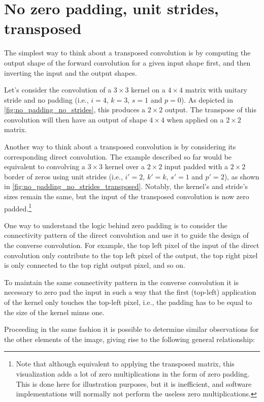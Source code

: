 \documentclass[notitlepage]{report}
\begin{document}
\section{No zero padding, unit strides, transposed}

The simplest way to think about a transposed convolution is by computing the
output shape of the forward convolution for a given input shape first, and then
inverting the input and the output shapes.

Let's consider the convolution of a $3 \times 3$ kernel on a $4 \times 4$
matrix with unitary stride and no padding (i.e., $i = 4$, $k = 3$, $s = 1$ and
$p = 0$). As depicted in \autoref{fig:no_padding_no_strides}, this produces a
$2 \times 2$ output. The transpose of this convolution will then have an output
of shape $4 \times 4$ when applied on a $2 \times 2$ matrix.

Another way to think about a transposed convolution is by considering its
corresponding direct convolution. The example described so far would be
equivalent to convolving a $3 \times 3$ kernel over a $2 \times 2$ input padded
with a $2 \times 2$ border of zeros using unit strides (i.e., $i' = 2$, $k' =
k$, $s' = 1$ and $p' = 2$), as shown in
\autoref{fig:no_padding_no_strides_transposed}. Notably, the kernel's and
stride's sizes remain the same, but the input of the transposed convolution is
now zero padded.\footnote{Note that although equivalent to applying the
    transposed matrix, this visualization adds a lot of zero multiplications in
    the form of zero padding.  This is done here for illustration purposes, but
    it is inefficient, and software implementations will normally not perform
    the useless zero multiplications.}

One way to understand the logic behind zero padding is to consider the
connectivity pattern of the direct convolution and use it to guide the design
of the converse convolution. For example, the top left pixel of the input of
the direct convolution only contribute to the top left pixel of the output, the
top right pixel is only connected to the top right output pixel, and so on.

To maintain the same connectivity pattern in the converse convolution it is
necessary to zero pad the input in such a way that the first (top-left)
application of the kernel only touches the top-left pixel, i.e., the padding
has to be equal to the size of the kernel minus one.

Proceeding in the same fashion it is possible to determine similar observations
for the other elements of the image, giving rise to the following general
relationship:
\end{document}

